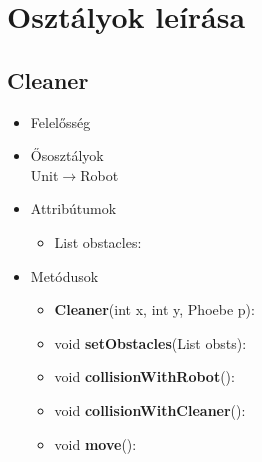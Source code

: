 \section{Osztályok leírása}

\subsection{Cleaner}
\begin{itemize}
\item Felelősség\\

\item Ősosztályok\\
Unit$\rightarrow$Robot
\item Attribútumok
    \begin{itemize}
        \item List obstacles:  
    \end{itemize}
\item Metódusok
	\begin{itemize}
	    \item \textbf{Cleaner}(int x, int y, Phoebe p):
		\item void \textbf{setObstacles}(List obsts): 
		\item void \textbf{collisionWithRobot}():
		\item void \textbf{collisionWithCleaner}():
		\item void \textbf{move}():
	\end{itemize}
\end{itemize}

